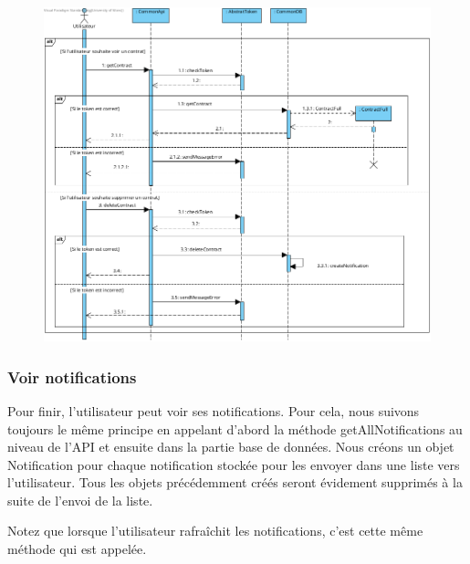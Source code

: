 \begin{figure}[h]
\centering
\includegraphics[height = 1\textwidth]{Base/sequence/img/common/Voir les contrats.png}
\end{figure}

\newpage

\subsubsection{Voir notifications}

\begin{flushleft}
Pour finir, l'utilisateur peut voir ses notifications. Pour cela, nous suivons toujours le même principe en appelant d'abord la méthode getAllNotifications au niveau de l'API et ensuite dans la partie base de données. Nous créons un objet Notification pour chaque notification stockée pour les envoyer dans une liste vers l'utilisateur. Tous les objets précédemment créés seront évidement supprimés à la suite de l'envoi de la liste.
\end{flushleft}

\begin{flushleft}
Notez que lorsque l'utilisateur rafraîchit les notifications, c'est cette même méthode qui est appelée.
\end{flushleft}


